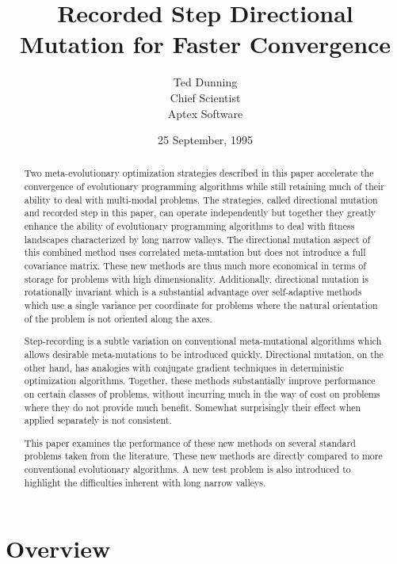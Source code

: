 \documentclass[12pt, titlepage]{article}
\begin{document}

\title{Recorded Step Directional Mutation for Faster Convergence}
\author{Ted Dunning\\
Chief Scientist\\
Aptex Software}
\date{25 September, 1995}
\begin{abstract}

Two meta-evolutionary optimization strategies described in this paper
accelerate the convergence of evolutionary programming algorithms
while still retaining much of their ability to deal with multi-modal
problems.  The strategies, called directional mutation and recorded
step in this paper, can operate independently but together they
greatly enhance the ability of evolutionary programming algorithms to
deal with fitness landscapes characterized by long narrow valleys.
The directional mutation aspect of this combined method uses
correlated meta-mutation but does not introduce a full covariance
matrix.  These new methods are thus much more economical in terms of
storage for problems with high dimensionality.  Additionally,
directional mutation is rotationally invariant which is a substantial
advantage over self-adaptive methods which use a single variance per
coordinate for problems where the natural orientation of the problem
is not oriented along the axes.

Step-recording is a subtle variation on conventional meta-mutational
algorithms which allows desirable meta-mutations to be introduced
quickly.  Directional mutation, on the other hand, has analogies with
conjugate gradient techniques in deterministic optimization
algorithms.  Together, these methods substantially improve performance
on certain classes of problems, without incurring much in the way of
cost on problems where they do not provide much benefit.  Somewhat
surprisingly their effect when applied separately is not consistent.

This paper examines the performance of these new methods on several
standard problems taken from the literature.  These new methods are
directly compared to more conventional evolutionary algorithms.  A new
test problem is also introduced to highlight the difficulties inherent
with long narrow valleys.
\end{abstract}
\maketitle
\section{Overview}
\end{document}
